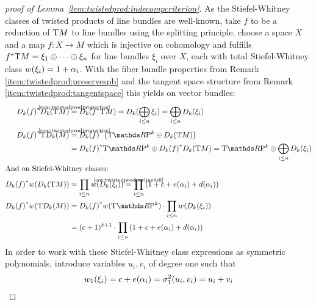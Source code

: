 \begin{proof}[proof of Lemma~\ref{lem:twistedprod:indecompcriterion}]
  As the Stiefel-Whitney classes of twisted products of line bundles
  are well-known, take $f$ to be a reduction of $\mathrm{T}M$ to line bundles
  using the splitting principle.
  \Idest choose a space $X$ and a map $f\colon X\to M$ which is
  injective on cohomology and fulfills
  ${f}^* \mathrm{T}M = \xi_1\oplus\dotsb\oplus\xi_n$ for line bundles
  $\xi_i$ over $X$, each with total Stiefel-Whitney class
  ${w}(\xi_i)=1+\alpha_i$.
  With the fiber bundle properties from
  Remark~%
  \ref{item:twistedprod:preservespb}
  and the tangent space structure from
  Remark~%
  \ref{item:twistedprod:tangentspace}
  this yields on vector bundles:
  \begin{align*}
    \pb{\Twistedprod{k}{f}} \Twistedprod{k}{\T M}
    &\cequalsby{\ref{rem:twistedprodproperties}}
      \Twistedprod{k}{\pb f \T M}
      = \Twistedprod{k}{\bigoplus_{i\leq n}\xi_i}
      = \bigoplus_{i\leq n}\Twistedprod{k}{\xi_i}
    \\
    \pb{\Twistedprod{k}{f}} \T{\Twistedprod{k}{M}}
    &\cequalsby{\ref{rem:twistedprodproperties}}
      \pb{\Twistedprod{k}{f}} \left(
      \T{\RP k} \oplus \Twistedprod{k}{\T M}
      \right)\\
    &= \pb{\Twistedprod{k}{f}} \T{\RP k}
      \oplus
      \pb{\Twistedprod{k}{f}} \Twistedprod{k}{\T M}
      = \T{\RP k} \oplus \bigoplus_{i\leq n}\Twistedprod{k}{\xi_i}\\
    \intertext{And on Stiefel-Whitney classes:}
    \pb{\Twistedprod{k}{f}} \W{\Twistedprod{k}{\T M}}
    &= \prod_{i\leq n} \W{\Twistedprod{k}{\xi_i}}
      \cequalsby{\ref{cor:twistedprod:swlinebdl}}
      \prod_{i\leq n} \left(1 + c + e(\alpha_i) + d(\alpha_i)\right)
    \\
    \pb{\Twistedprod{k}{f}} \W{\T\Twistedprod{k}{M}}
    &= \pb{\Twistedprod{k}{f}}\W{\T{\RP k}}
      \cdot \prod_{i\leq n} \W{\Twistedprod{k}{\xi_i}} \\
    &= (c+1)^{k+1}
      \cdot \prod_{i\leq n} \left(1+c+e(\alpha_i)+d(\alpha_i)\right)
  \end{align*}
  In order to work with these Stiefel-Whitney class expressions as
  symmetric polynomials, introduce variables $u_i, v_i$ of degree
  one such that
  \begin{align*}
    \w1{\xi_i} &= c+e(\alpha_i) = \el 1 2(u_i, v_i) = u_i+v_i \\

\end{align*}
\end{proof}
